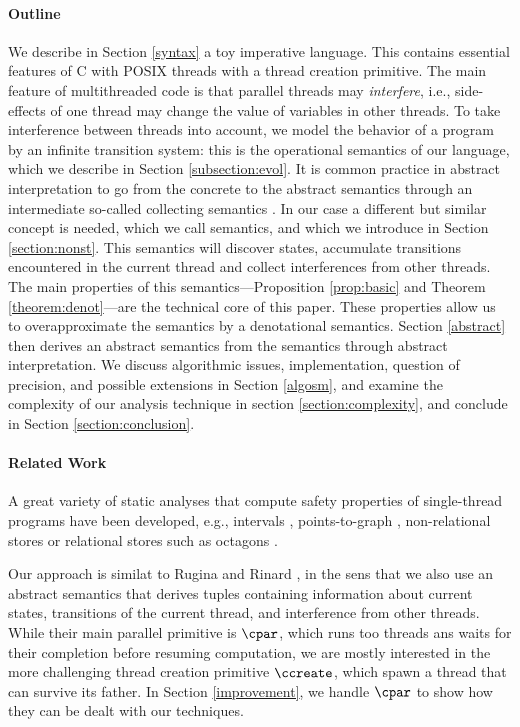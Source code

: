 \documentclass[12pt]{article}
\begin{document}
\paragraph{Outline} We describe in Section \ref{syntax} a toy imperative language.
 This contains essential features of C with POSIX threads \cite{posix-but} with a thread creation primitive. 
The main feature of multithreaded code is that parallel threads may \emph{interfere}, i.e., side-effects of one thread may change the value of variables in other threads.
To take interference between threads into account, we model the behavior of a program by an infinite transition system: this is the operational semantics of our language, which we describe in Section \ref{subsection:evol}.
It is common practice in abstract interpretation to go from the concrete to the abstract semantics through an intermediate so-called collecting semantics \cite{CousotCousot92-1}. In our case a different but similar concept is needed, which we call \cname semantics, and which we introduce in Section \ref{section:nonst}.
This semantics will discover states, accumulate transitions encountered in the current thread and collect interferences from other threads. 
The main properties of this semantics---Proposition \ref{prop:basic} and Theorem \ref{theorem:denot}---are the technical core of this paper. These properties allow us to overapproximate the \cname semantics by a denotational semantics. Section \ref{abstract} then derives an abstract semantics from the \cname semantics through abstract interpretation. We discuss algorithmic issues, implementation, question of precision, and possible extensions in Section \ref{algosm}, and examine the complexity of our analysis technique in section \ref{section:complexity}, and conclude in Section \ref{section:conclusion}.

\paragraph{Related Work}
A great variety of static analyses that compute safety
properties of single-thread
programs have been developed, e.g., intervals \cite{CousotCousot04-WCC}, points-to-graph \cite{andersen94program,steensgaard96pointsto}, non-relational stores \cite{mine:LCTES06,AllamigeonGodardHymansSAS06} or relational stores such as octagons \cite{mine:padoII}. 

Our approach is similat to Rugina and Rinard \citerinard, in the sens that  we also use an abstract semantics that derives tuples containing information about current states, transitions of the current thread, and interference from other threads. While their main parallel primitive is \(\cpar\), which runs too threads ans waits for their completion before resuming computation, we are mostly interested in the more challenging thread creation primitive \(\ccreate\), which spawn a thread that can survive its father. In Section \ref{improvement}, we handle \(\cpar\) to show how they can be dealt with our techniques.
\end{document}

